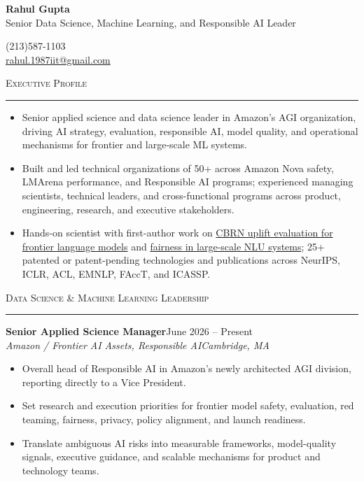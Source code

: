 \documentclass[11pt]{article}
\newcommand{\sectionheading}[1]{%
  \vspace{8pt}%
  {\large\scshape #1}\par\vspace{1pt}\hrule\vspace{3pt}%
}
\newcommand{\resumeentry}[5]{%
  \textbf{#1}\hfill #2\\
  \textit{#3}\hfill \textit{#4}
  \begin{itemize}
    #5
  \end{itemize}
  \vspace{2pt}
}
\newcommand{\socialicons}{%
  \href{https://www.linkedin.com/in/rahul-gupta-16139818}{\textcolor[HTML]{0077B5}{\Large\faLinkedin}}%
  \hspace{0.55em}%
  \href{https://scholar.google.com/citations?user=gSTLsFcAAAAJ}{\textcolor[HTML]{4285F4}{\Large\aiGoogleScholarSquare}}%
}
\begin{document}
\begin{center}
  {\LARGE\bfseries Rahul Gupta}\\[4pt]
  {\large Senior Data Science, Machine Learning, and Responsible AI Leader}
\end{center}

\vspace{10pt}

\begin{minipage}[t]{0.48\textwidth}
  (213)587-1103\\
  \href{mailto:rahul.1987iit@gmail.com}{rahul.1987iit@gmail.com}
\end{minipage}
\hfill
\begin{minipage}[t]{0.48\textwidth}
  \raggedleft
  \socialicons
\end{minipage}

\sectionheading{Executive Profile}
\begin{itemize}
  \item Senior applied science and data science leader in Amazon's AGI organization, driving AI strategy, evaluation, responsible AI, model quality, and operational mechanisms for frontier and large-scale ML systems.
  \item Built and led technical organizations of 50+ across Amazon Nova safety, LMArena performance, and Responsible AI programs; experienced managing scientists, technical leaders, and cross-functional programs across product, engineering, research, and executive stakeholders.
  \item Hands-on scientist with first-author work on \href{https://arxiv.org/abs/2607.12200}{CBRN uplift evaluation for frontier language models} and \href{https://dl.acm.org/doi/abs/10.1145/3539597.3575785}{fairness in large-scale NLU systems}; 25+ patented or patent-pending technologies and publications across NeurIPS, ICLR, ACL, EMNLP, FAccT, and ICASSP.
\end{itemize}

\sectionheading{Data Science \& Machine Learning Leadership}

\resumeentry
  {Senior Applied Science Manager}
  {June 2026 -- Present}
  {Amazon / Frontier AI Assets, Responsible AI}
  {Cambridge, MA}
  {\item Overall head of Responsible AI in Amazon's newly architected AGI division, reporting directly to a Vice President.
   \item Set research and execution priorities for frontier model safety, evaluation, red teaming, fairness, privacy, policy alignment, and launch readiness.
   \item Translate ambiguous AI risks into measurable frameworks, model-quality signals, executive guidance, and scalable mechanisms for product and technology teams.}
\end{document}
